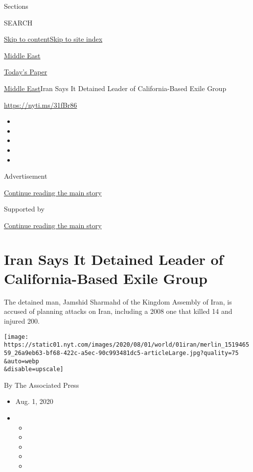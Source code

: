 Sections

SEARCH

\protect\hyperlink{site-content}{Skip to
content}\protect\hyperlink{site-index}{Skip to site index}

\href{https://www.nytimes.com/section/world/middleeast}{Middle East}

\href{https://myaccount.nytimes.com/auth/login?response_type=cookie\&client_id=vi}{}

\href{https://www.nytimes.com/section/todayspaper}{Today's Paper}

\href{/section/world/middleeast}{Middle East}\textbar{}Iran Says It
Detained Leader of California-Based Exile Group

\url{https://nyti.ms/31fBr86}

\begin{itemize}
\item
\item
\item
\item
\item
\end{itemize}

Advertisement

\protect\hyperlink{after-top}{Continue reading the main story}

Supported by

\protect\hyperlink{after-sponsor}{Continue reading the main story}

\hypertarget{iran-says-it-detained-leader-of-california-based-exile-group}{%
\section{Iran Says It Detained Leader of California-Based Exile
Group}\label{iran-says-it-detained-leader-of-california-based-exile-group}}

The detained man, Jamshid Sharmahd of the Kingdom Assembly of Iran, is
accused of planning attacks on Iran, including a 2008 one that killed 14
and injured 200.

\texttt{[image: https://static01.nyt.com/images/2020/08/01/world/01iran/merlin\_151946559\_26a9eb63-bf68-422c-a5ec-90c993481dc5-articleLarge.jpg?quality=75\\\&auto=webp\\\&disable=upscale]}

By The Associated Press

\begin{itemize}
\item
  Aug. 1, 2020
\item
  \begin{itemize}
  \item
  \item
  \item
  \item
  \item
  \end{itemize}
\end{itemize}

